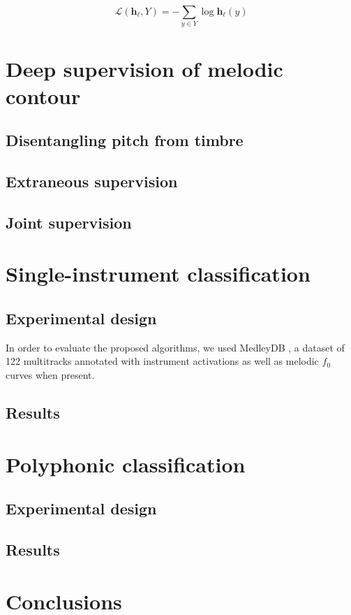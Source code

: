 \documentclass{article}
\begin{document}
\begin{equation}
\mathscr{L}(\mathbf{h}_{\boldsymbol{\ell}}, Y) = - \sum_{y \in Y} \log \mathbf{h}_{\boldsymbol{\ell}}(y)
\end{equation}

\section{Deep supervision of melodic contour}
\subsection{Disentangling pitch from timbre}

\subsection{Extraneous supervision}

\subsection{Joint supervision}


\section{Single-instrument classification}\label{sec:single-instrument}
\subsection{Experimental design}
In order to evaluate the proposed algorithms, we used MedleyDB \cite{Bittner2014}, a dataset of 122 multitracks annotated with instrument activations as well as melodic $f_0$ curves when present. 

\subsection{Results}


\section{Polyphonic classification}\label{sec:polyphonic}
\subsection{Experimental design}

\subsection{Results}


\section{Conclusions}


\end{document}
